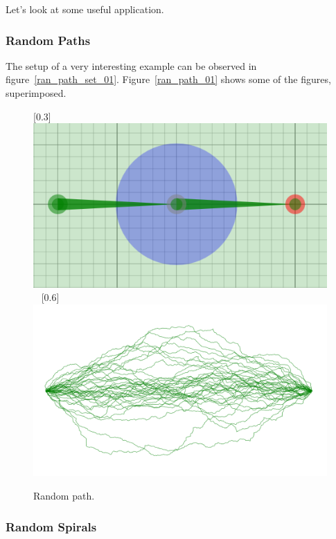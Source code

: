		Let's look at some useful application.

		\subsubsection{Random Paths}

			The setup of a very interesting example can be observed in figure~\ref{ran_path_set_01}.
			Figure~\ref{ran_path_01} shows some of the figures, superimposed.

			\begin{figure}[H]
				\centering
				\caption{Random path.}
				[0.3\textwidth]
					{\includegraphics[width=0.29\TW]{img/Randomness/Node/ran_path_01.png}}
				~
				[0.6\textwidth]
					{\includegraphics[width=0.59\TW]{img/Randomness/Node/ran_path_02.png}}
			\end{figure}

		\subsubsection{Random Spirals}

